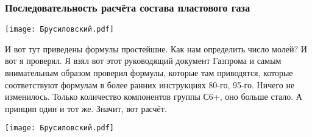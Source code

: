 \documentclass[main.tex]{subfiles}
\begin{document}
\subsubsection{Последовательность расчёта состава пластового газа}

\begin{center}
\texttt{[image: Брусиловский.pdf]}
\end{center}

И вот тут приведены формулы простейшие.
Как нам определить число молей?
И вот я проверял.
Я взял вот этот руководящий документ Газпрома и самым внимательным образом проверил формулы, которые там приводятся, которые соответствуют формулам в более ранних инструкциях 80-го, 95-го.
Ничего не изменилось.
Только количество компонентов группы С6+, оно больше стало.
А принцип один и тот же.
Значит, вот расчёт.

\begin{center}
\texttt{[image: Брусиловский.pdf]}
\end{center}
\end{document}
